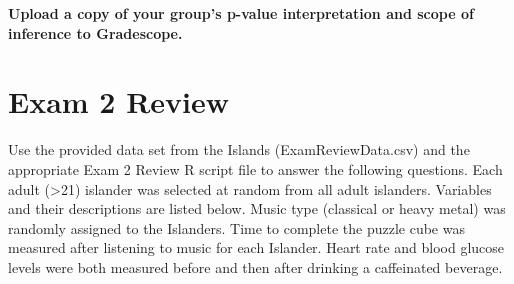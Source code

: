 \documentclass[
]{report}
\begin{document}
\textbf{Upload a copy of your group's p-value interpretation and scope of inference to Gradescope.}

\newpage

\hypertarget{exam-2-review}{%
\chapter{Exam 2 Review}\label{exam-2-review}}

Use the provided data set from the Islands (ExamReviewData.csv) and the appropriate Exam 2 Review R script file to answer the following questions. Each adult (\textgreater21) islander was selected at random from all adult islanders. Variables and their descriptions are listed below. Music type (classical or heavy metal) was randomly assigned to the Islanders. Time to complete the puzzle cube was measured after listening to music for each Islander. Heart rate and blood glucose levels were both measured before and then after drinking a caffeinated beverage.
\end{document}
